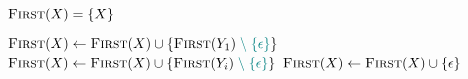 
\begin{algorithm}[H]
\begin{algorithmic}[1]
    \pause
      
      \State $\textsc{First}(X) = \{X\}$
    \EndIf

    \pause
    \hStatex
     
      \State $\textsc{First}(X) \gets \textsc{First}(X) \cup \{\textsc{First}(Y_{1}) \;\textcolor{teal}{\setminus\; \{\epsilon\}}\}$
      \pause
            \State $\textsc{First}(X) \gets \textsc{First}(X) \cup \{\textsc{First}(Y_{i}) \;\textcolor{teal}{\setminus\; \{\epsilon\}}\}$
          \EndIf
      \EndFor
      \pause
       
        \State $\textsc{First}(X) \gets \textsc{First}(X) \cup \{\epsilon\}$
      \EndIf
    \EndFor
  \EndProcedure
\end{algorithmic}
\end{algorithm}
